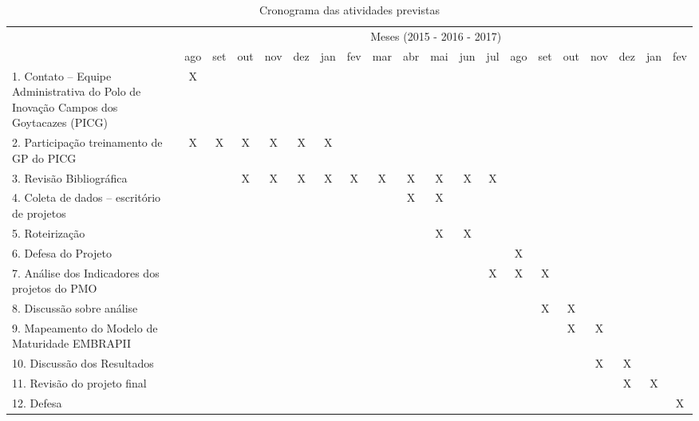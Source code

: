   \begin{sidewaystable}[h] %
    \centering
    \setlength{\tabcolsep}{4pt}
    \begin{tabular}{| m{} |c|c|c|c|c|c|c|c|c|c|c|c|c|c|c|c|c|c|c|}\hline
      & \multicolumn{19}{c|}{Meses (2015 - 2016 - 2017)}\\ \cline{2-20}
      \raisebox{1.5ex}{Etapas} & ago & set & out & nov & dez & jan & fev & mar & abr & mai & jun & jul & ago & set & out & nov & dez & jan & fev \\ \hline \hline
      1. Contato – Equipe Administrativa do Polo de Inovação Campos dos Goytacazes (PICG)
        & X &   &   &   &   &   &   &   &   &   &   &   &   &   &   &   &   &  &  \\ \hline
      2. Participação treinamento de GP do PICG
        & X & X & X & X & X & X &   &   &   &   &   &   &   &   &   &   &   &  &  \\ \hline
      3. Revisão Bibliográfica
        &   &   & X & X & X & X & X & X & X & X & X & X &   &   &   &   &   &  &  \\ \hline
      4. Coleta de dados – escritório de projetos
        &   &   &   &   &   &   &   &   & X & X &   &   &   &   &   &   &   &  &  \\ \hline
      5. Roteirização
        &   &   &   &   &   &   &   &   &   & X & X &   &   &   &   &   &   &  &  \\ \hline
      6. Defesa do Projeto
        &   &   &   &   &   &   &   &   &   &   &   &   & X &   &   &   &   &  &  \\ \hline
      7. Análise dos Indicadores dos projetos do PMO
        &   &   &   &   &   &   &   &   &   &   &   & X & X & X &   &   &   &  &  \\ \hline
      8. Discussão sobre análise
        &   &   &   &   &   &   &   &   &   &   &   &   &   & X & X &   &   &  &  \\ \hline
      9. Mapeamento do Modelo de Maturidade EMBRAPII
        &   &   &   &   &   &   &   &   &   &   &   &   &   &   & X & X &   &  &  \\ \hline
      10. Discussão dos Resultados
        &   &   &   &   &   &   &   &   &   &   &   &   &   &   &   & X & X &  &  \\ \hline
      11. Revisão do projeto final
        &   &   &   &   &   &   &   &   &   &   &   &   &   &   &   &   & X & X &  \\ \hline
      12. Defesa
        &   &   &   &   &   &   &   &   &   &   &   &   &   &   &   &   &   &  & X \\ \hline
    \end{tabular}
    \caption{Cronograma das atividades previstas}
    \label{t_cronograma}
  \end{sidewaystable}

